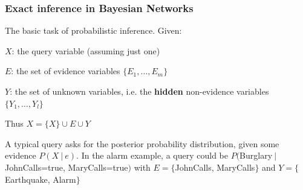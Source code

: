\documentclass[10pt]{report}
\begin{document}
\subsubsection{Exact inference in Bayesian Networks}
The basic task of probabilistic inference. Given:\begin{list}{}{}
	\item $X$: the query variable (assuming just one)
	\item $E$: the set of evidence variables $\{E_1,\ldots,E_m\}$
	\item $Y$: the set of unknown variables, i.e. the \textbf{hidden} non-evidence variables $\{Y_1,\ldots,Y_l\}$
	\item Thus $X = \{X\} \cup E \cup Y$
\end{list}
A typical query asks for the posterior probability distribution, given some evidence $P(X\:|\:e)$. In the alarm example, a query could be $P($Burglary$\:|\:$JohnCalls=true, MaryCalls=true$)$ with $E=\{$JohnCalls, MaryCalls$\}$ and $Y=\{$Earthquake, Alarm$\}$
\end{document}

